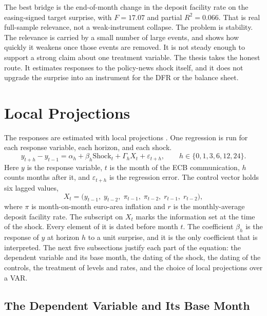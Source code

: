 The best bridge is the end-of-month change in the deposit facility rate on the easing-signed target surprise, with \(F=17.07\) and partial \(R^2=0.066\). That is real full-sample relevance, not a weak-instrument collapse. The problem is stability. The relevance is carried by a small number of large events, and  shows how quickly it weakens once those events are removed. It is not steady enough to support a strong claim about one treatment variable. The thesis takes the honest route. It estimates responses to the policy-news shock itself, and it does not upgrade the surprise into an instrument for the DFR or the balance sheet.

\section{Local Projections}
\label{sec:local-projections}

The responses are estimated with local projections \parencite{Jorda2005}. One regression is run for each response variable, each horizon, and each shock.
\begin{equation}
  y_{t+h} - y_{t-1}
  =
  \alpha_h
  + \beta_h \mathrm{Shock}_{t}
  + \Gamma_h X_t
  + \varepsilon_{t+h},
  \qquad
  h \in \{0,1,3,6,12,24\}.
  \label{eq:baseline-lp}
\end{equation}
Here \(y\) is the response variable, \(t\) is the month of the ECB communication, \(h\) counts months after it, and \(\varepsilon_{t+h}\) is the regression error. The control vector holds six lagged values,
\begin{equation}
  X_t
  =
  \bigl(y_{t-1},\; y_{t-2},\; \pi_{t-1},\; \pi_{t-2},\; r_{t-1},\; r_{t-2}\bigr),
  \label{eq:lp-controls}
\end{equation}
where \(\pi\) is month-on-month euro-area inflation and \(r\) is the monthly-average deposit facility rate. The subscript on \(X_t\) marks the information set at the time of the shock. Every element of it is dated before month \(t\). The coefficient \(\beta_h\) is the response of \(y\) at horizon \(h\) to a unit surprise, and it is the only coefficient that is interpreted. The next five subsections justify each part of the equation: the dependent variable and its base month, the dating of the shock, the dating of the controls, the treatment of levels and rates, and the choice of local projections over a VAR.

\subsection{The Dependent Variable and Its Base Month}

